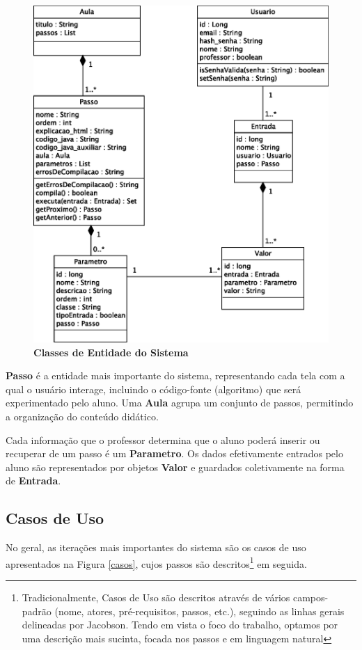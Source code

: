 \documentclass{abnt}
\begin{document}
\begin{figure}
\begin{center}
\includegraphics[scale=0.8]{classes.eps}
\caption{{\bf Classes de Entidade do Sistema}}
\label{classes}
\end{center}
\end{figure}

\textbf{Passo} é a entidade mais importante do sistema, representando cada tela com a qual o usuário interage, incluindo o código-fonte (algoritmo) que será experimentado pelo aluno. Uma \textbf{Aula} agrupa um conjunto de passos, permitindo a organização do conteúdo didático.

	Cada informação que o professor determina que o aluno poderá inserir ou recuperar de um passo é um \textbf{Parametro}. Os dados efetivamente entrados pelo aluno são representados por objetos \textbf{Valor} e guardados coletivamente na forma de \textbf{Entrada}.

\subsection{Casos de Uso}

No geral, as iterações mais importantes do sistema são os casos de uso apresentados na Figura \ref{casos}, cujos passos são descritos\footnote{Tradicionalmente, Casos de Uso são descritos através de vários campos-padrão (nome, atores, pré-requisitos, passos, etc.), seguindo as linhas gerais delineadas por Jacobson\cite{Jacobson}. Tendo em vista o foco do trabalho, optamos por uma descrição mais sucinta, focada nos passos e em linguagem natural} em seguida.
\end{document}

